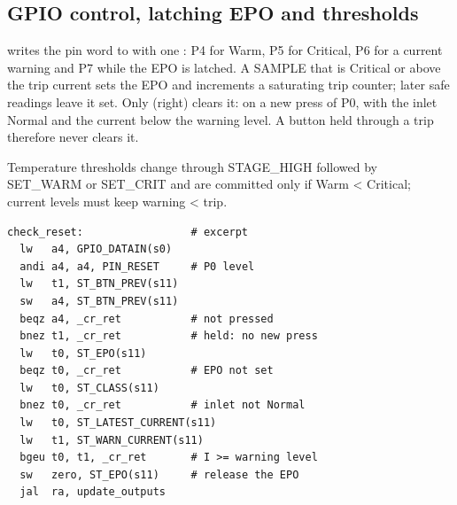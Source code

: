 \subsection{GPIO control, latching EPO and thresholds}\label{sec:epo}
\noindent\begin{minipage}[t]{0.5\linewidth}\RaggedRight
\vspace{0pt}
 writes the pin word to  with one : P4 for Warm, P5 for Critical, P6 for a current warning and P7 while the EPO is latched. A SAMPLE that is Critical or above the trip current sets the EPO and increments a saturating trip counter; later safe readings leave it set. Only  (right) clears it: on a new press of P0, with the inlet Normal and the current below the warning level. A button held through a trip therefore never clears it.\par\smallskip
Temperature thresholds change through STAGE\_HIGH followed by SET\_WARM or SET\_CRIT and are committed only if Warm < Critical; current levels must keep warning < trip.
\end{minipage}\hfill
\begin{minipage}[t]{0.47\linewidth}
\vspace{0pt}
\begin{lstlisting}
check_reset:                 # excerpt
  lw   a4, GPIO_DATAIN(s0)
  andi a4, a4, PIN_RESET     # P0 level
  lw   t1, ST_BTN_PREV(s11)
  sw   a4, ST_BTN_PREV(s11)
  beqz a4, _cr_ret           # not pressed
  bnez t1, _cr_ret           # held: no new press
  lw   t0, ST_EPO(s11)
  beqz t0, _cr_ret           # EPO not set
  lw   t0, ST_CLASS(s11)
  bnez t0, _cr_ret           # inlet not Normal
  lw   t0, ST_LATEST_CURRENT(s11)
  lw   t1, ST_WARN_CURRENT(s11)
  bgeu t0, t1, _cr_ret       # I >= warning level
  sw   zero, ST_EPO(s11)     # release the EPO
  jal  ra, update_outputs
\end{lstlisting}
\end{minipage}
